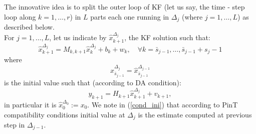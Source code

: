 \documentclass[smallcondensed]{svjour3}
\begin{document}
\noindent The innovative idea is to split the outer loop of KF (let us say, the time - step loop along $k=1, \ldots, r$)  in $L$ parts each one running in $\Delta_j$ (where $j=1, \ldots,L$) as described below. \\

\noindent  For $j=1, \ldots, L$, 
  let us indicate by  $\widehat{x}_{k+1}^{\Delta_j}$, the KF solution  such that:
\begin{equation}
\widehat{x}_{k+1}^{\Delta_{j}}=M_{k,k+1}\widehat{x}_{k}^{\Delta_{j}}+b_{k}+w_{k}, \quad \forall k=\bar{s}_{j-1},\ldots,\bar{s}_{j-1}+s_{j}-1
\end{equation}
where 
\begin{equation}\label{cond_ini}
\widehat{x}_{\bar{s}_{j-1}}^{\Delta_{j}}=\widehat{x}_{\bar{s}_{j-1}}^{\Delta_{j-1}}
\end{equation} 
is the  initial value  such that (according to DA condition):
\begin{equation}
y_{k+1}=H_{k+1}\widehat{x}_{k+1}^{\Delta_{j}}+v_{k+1},
\end{equation}
in particular it is $\widehat{x}_{0}^{\Delta_{0}}:= x_{0}$. We note in (\ref{cond_ini}) that according to  PinT compatibility conditions initial value at $\Delta_j$ is  the estimate computed at previous step in $\Delta_{j-1}$. \\
\end{document}

